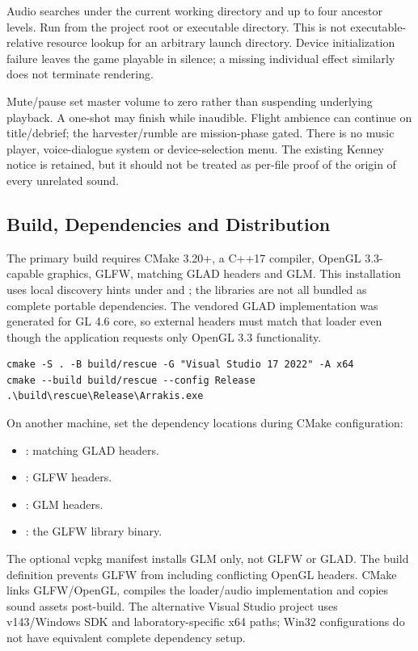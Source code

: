 Audio searches  under the current working directory and up to four ancestor levels. Run from the project root or executable directory. This is not executable-relative resource lookup for an arbitrary launch directory. Device initialization failure leaves the game playable in silence; a missing individual effect similarly does not terminate rendering.

Mute/pause set master volume to zero rather than suspending underlying playback. A one-shot may finish while inaudible. Flight ambience can continue on title/debrief; the harvester/rumble are mission-phase gated. There is no music player, voice-dialogue system or device-selection menu. The existing Kenney notice is retained, but it should not be treated as per-file proof of the origin of every unrelated sound.

\subsection{Build, Dependencies and Distribution}
The primary build requires CMake 3.20+, a C++17 compiler, OpenGL 3.3-capable graphics, GLFW, matching GLAD headers and GLM. This installation uses local discovery hints under  and ; the libraries are not all bundled as complete portable dependencies. The vendored GLAD implementation was generated for GL 4.6 core, so external headers must match that loader even though the application requests only OpenGL 3.3 functionality.
\begin{lstlisting}
cmake -S . -B build/rescue -G "Visual Studio 17 2022" -A x64
cmake --build build/rescue --config Release
.\build\rescue\Release\Arrakis.exe
\end{lstlisting}
On another machine, set the dependency locations during CMake configuration:
\begin{itemize}
\item {}: matching GLAD headers.
\item {}: GLFW headers.
\item {}: GLM headers.
\item {}: the GLFW library binary.
\end{itemize}
The optional vcpkg manifest installs GLM only, not GLFW or GLAD. The build definition  prevents GLFW from including conflicting OpenGL headers. CMake links GLFW/OpenGL, compiles the loader/audio implementation and copies sound assets post-build. The alternative Visual Studio project uses v143/Windows SDK and laboratory-specific x64 paths; Win32 configurations do not have equivalent complete dependency setup.

